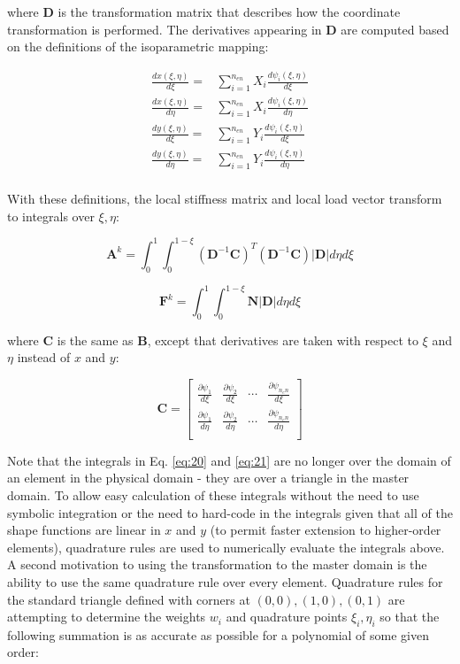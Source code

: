 \documentclass[10pt]{article}
\newcommand{\beq}{\begin{equation}}
\newcommand{\eeq}{\end{equation}}
\newcommand{\beqa}{\begin{equation}\begin{aligned}}
\newcommand{\eeqa}{\end{aligned}\end{equation}}
\begin{document}
where \textbf{D} is the transformation matrix that describes how the coordinate transformation is performed. The derivatives appearing in \textbf{D} are computed based on the definitions of the isoparametric mapping:

\beqa
\frac{dx(\xi,\eta)}{d\xi}=&\sum_{i=1}^{n_{en}}X_i\frac{d\psi_i(\xi,\eta)}{d\xi}\\
\frac{dx(\xi,\eta)}{d\eta}=&\sum_{i=1}^{n_{en}}X_i\frac{d\psi_i(\xi,\eta)}{d\eta}\\
\frac{dy(\xi,\eta)}{d\xi}=&\sum_{i=1}^{n_{en}}Y_i\frac{d\psi_i(\xi,\eta)}{d\xi}\\
\frac{dy(\xi,\eta)}{d\eta}=&\sum_{i=1}^{n_{en}}Y_i\frac{d\psi_i(\xi,\eta)}{d\eta}\\
\eeqa

With these definitions, the local stiffness matrix and local load vector transform to integrals over \(\xi, \eta\):

\beq
\label{eq:20}
\textbf{A}^k=\int_{0}^{1} \int_{0}^{1-\xi}(\textbf{D}^{-1}\textbf{C})^T(\textbf{D}^{-1}\textbf{C})|\textbf{D}| d\eta d\xi
\eeq

\beq
\label{eq:21}
\textbf{F}^k=\int_{0}^{1} \int_{0}^{1-\xi}\textbf{N}|\textbf{D}| d\eta d\xi
\eeq

where \textbf{C} is the same as \textbf{B}, except that derivatives are taken with respect to \(\xi\) and \(\eta\) instead of \(x\) and \(y\):

\beq
\textbf{C}=\begin{bmatrix}
\frac{\partial\psi_1}{d\xi} & \frac{\partial\psi_2}{d\xi} & \cdots & \frac{\partial\psi_{n_en}}{d\xi}\\
\frac{\partial\psi_1}{d\eta} & \frac{\partial\psi_2}{d\eta} & \cdots & \frac{\partial\psi_{n_en}}{d\eta}\\
\end{bmatrix}
\eeq

Note that the integrals in Eq. \eqref{eq:20} and \eqref{eq:21} are no longer over the domain of an element in the physical domain - they are over a triangle in the master domain. To allow easy calculation of these integrals without the need to use symbolic integration or the need to hard-code in the integrals given that all of the shape functions are linear in \(x\) and \(y\) (to permit faster extension to higher-order elements), quadrature rules are used to numerically evaluate the integrals above. A second motivation to using the transformation to the master domain is the ability to use the same quadrature rule over every element. Quadrature rules for the standard triangle defined with corners at \((0,0), (1,0), (0,1)\) are attempting to determine the weights \(w_i\) and quadrature points \(\xi_i,\eta_i\) so that the following summation is as accurate as possible for a polynomial of some given order:
\end{document}
